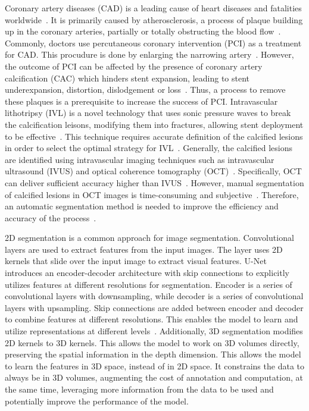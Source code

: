 \documentclass[a4paper,11pt,oneside]{report}
\begin{document}
Coronary artery diseases (CAD) is a leading cause of heart diseases and fatalities worldwide~\cite{Virani2021Heart, Wu2015}. It is primarily caused by atherosclerosis, a process of plaque building up in the coronary arteries, partially or totally obstructing the blood flow~\cite{Shahjehan2023}. Commonly, doctors use percutaneous coronary intervention (PCI) as a treatment for CAD. This procudure is done by enlarging the narrowing artery~\cite{Ahmad2023}. However, the outcome of PCI can be affected by the presence of coronary artery calcification (CAC) which hinders stent expansion, leading to stent underexpansion, distortion, dislodgement or loss~\cite{Hennessey2023}. Thus, a process to remove these plaques is a prerequisite to increase the success of PCI. Intravascular lithotripsy (IVL) is a novel technology that uses sonic pressure waves to break the calcification leisons, modifying them into fractures, allowing stent deployment to be effective~\cite{Butt2023}. This technique requires accurate definition of the calcified lesions in order to select the optimal strategy for IVL~\cite{Butt2023}. Generally, the calcified lesions are identified using intravascular imaging techniques such as intravascular ultrasound (IVUS) and optical coherence tomography (OCT)~\cite{Butt2023}. Specifically, OCT can deliver sufficient accuracy higher than IVUS~\cite{Fujimoto2003, Costopoulos2016}. However, manual segmentation of calcified lesions in OCT images is time-consuming and subjective~\cite{Segars2013, Oktay2020, Carpenter2022}. Therefore, an automatic segmentation method is needed to improve the efficiency and accuracy of the process~\cite{Carpenter2022}.

2D segmentation is a common approach for image segmentation. Convolutional layers are used to extract features from the input images. The layer uses 2D kernels that slide over the input image to extract visual features. U-Net introduces an encoder-decoder architecture with skip connections to explicitly utilizes features at different resolutions for segmentation. Encoder is a series of convolutional layers with downsampling, while decoder is a series of convolutional layers with upsampling. Skip connections are added between encoder and decoder to combine features at different resolutions. This enables the model to learn and utilize representations at different levels~\cite{Ronneberger2015}. Additionally, 3D segmentation modifies 2D kernels to 3D kernels. This allows the model to work on 3D volumes directly, preserving the spatial information in the depth dimension. This allows the model to learn the features in 3D space, instead of in 2D space. It constrains the data to always be in 3D volumes, augmenting the cost of annotation and computation, at the same time, leveraging more information from the data to be used and potentially improve the performance of the model.
\end{document}
